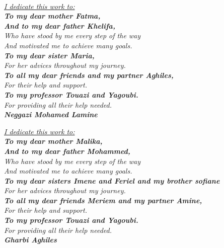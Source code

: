 \vspace*{0.1in}

\thispagestyle{empty}

\let\clearpage\relax
{}

\begin{center}
    \textit{\fontsize{34}{46}{\bfseries{\color{Black}{Dedication}}}}
    \\
    \vspace{0.2in}
    \itshape
    \Large{\underline{I dedicate this work to:}}\\          \textbf{\large{To my dear mother Fatma,}}\\\vspace{-0.1in}
    \textbf{\large{And to my dear father Khelifa,}}\\
    \large{Who have stood by me every step of the way\\\vspace{-0.1in}And motivated me to achieve many goals.}\\
    \textbf{\large{To my dear sister Maria,}}\\
    \large{For her advices throughout my journey.}\\
    \textbf{\large{To all my dear friends and my partner Aghiles,}}\\
    \large{For their help and support.}\\
    \textbf{\large{To my professor Touazi and Yagoubi.}}\\
    \large{For providing all their help needed.}\\
    \hfill\textbf{\Large{Neggazi Mohamed Lamine}}

    \vspace{0.4in}
    \itshape
    \Large{\underline{I dedicate this work to:}}\\          \textbf{\large{To my dear mother Malika,}}\\\vspace{-0.1in}
    \textbf{\large{And to my dear father Mohammed,}}\\
    \large{Who have stood by me every step of the way\\\vspace{-0.1in}And motivated me to achieve many goals.}\\
    \textbf{\large{To my dear sisters Imene and Feriel and my brother sofiane}}\\
    \large{For her advices throughout my journey.}\\
    \textbf{\large{To all my dear friends Meriem and my partner Amine,}}\\
    \large{For their help and support.}\\
    \textbf{\large{To my professor Touazi and Yagoubi.}}\\
    \large{For providing all their help needed.}\\
    \hfill\textbf{\Large{Gharbi Aghiles}}

\end{center}


